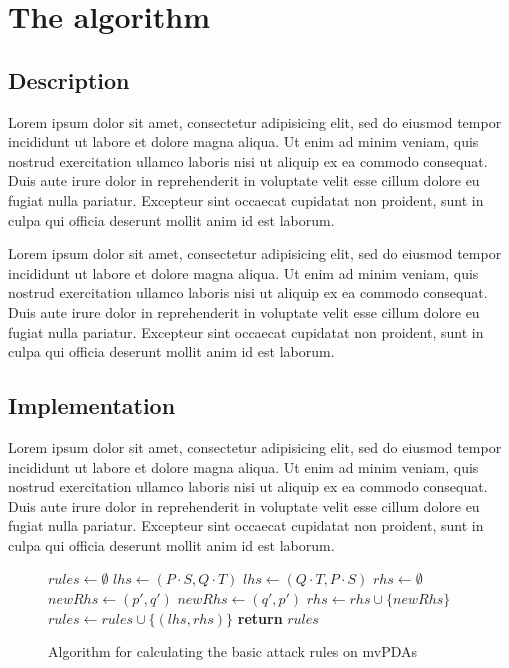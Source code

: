 \chapter{The algorithm}

\section{Description}

Lorem ipsum dolor sit amet, consectetur adipisicing elit, sed do eiusmod tempor incididunt ut labore et dolore magna aliqua. Ut enim ad minim veniam, quis nostrud exercitation ullamco laboris nisi ut aliquip ex ea commodo consequat. Duis aute irure dolor in reprehenderit in voluptate velit esse cillum dolore eu fugiat nulla pariatur. Excepteur sint occaecat cupidatat non proident, sunt in culpa qui officia deserunt mollit anim id est laborum.

Lorem ipsum dolor sit amet, consectetur adipisicing elit, sed do eiusmod tempor incididunt ut labore et dolore magna aliqua. Ut enim ad minim veniam, quis nostrud exercitation ullamco laboris nisi ut aliquip ex ea commodo consequat. Duis aute irure dolor in reprehenderit in voluptate velit esse cillum dolore eu fugiat nulla pariatur. Excepteur sint occaecat cupidatat non proident, sunt in culpa qui officia deserunt mollit anim id est laborum.

\section{Implementation}

Lorem ipsum dolor sit amet, consectetur adipisicing elit, sed do eiusmod tempor incididunt ut labore et dolore magna aliqua. Ut enim ad minim veniam, quis nostrud exercitation ullamco laboris nisi ut aliquip ex ea commodo consequat. Duis aute irure dolor in reprehenderit in voluptate velit esse cillum dolore eu fugiat nulla pariatur. Excepteur sint occaecat cupidatat non proident, sunt in culpa qui officia deserunt mollit anim id est laborum.

\begin{figure}[ht]
\caption{Algorithm for calculating the basic attack rules on mvPDAs}
\begin{algorithmic}[1]
  \State $rules ← ∅$
      \State $lhs ← (P⋅S, Q⋅T)$
    \Else
      \State $lhs ← (Q⋅T, P⋅S)$
    \EndIf
      \State $rhs ← ∅$
          \State $newRhs ← (p', q')$
        \Else
          \State $newRhs ← (q', p')$
        \EndIf
        \State $rhs ← rhs ∪ \{ newRhs \}$
      \EndFor
      \State $rules ← rules ∪ \{(lhs, rhs)\}$
    \EndFor
  \EndFor
  \State \textbf{return} $rules$
\EndFunction
\end{algorithmic}
\end{figure}

